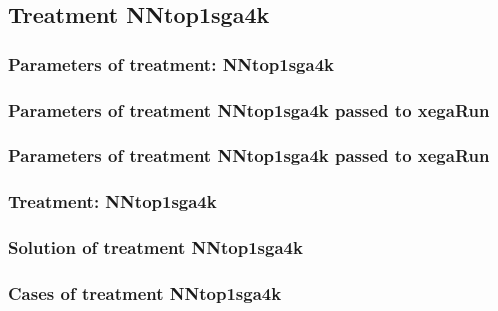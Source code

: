 \documentclass[18pt,c]{beamer}
\makeatletter
\def\beamer@writeslidentry@miniframesoff{%
  \expandafter\beamer@ifempty\expandafter{\beamer@framestartpage}{}%
  {%
   \clearpage\beamer@notesactions%
  }
}
\newcommand*{\miniframesoff}{\let\beamer@writeslidentry=\beamer@writeslidentry@miniframesoff}
\makeatother
\begin{document}
\miniframesoff
\subsection{Treatment NNtop1sga4k}

 \begin{frame}
 \fontsize{8pt}{9pt}\selectfont
 \frametitle{  Parameters of treatment: NNtop1sga4k 
 }

 \label{ExpDtParmTable006.tex}  
 \end{frame}


 \begin{frame}
 \fontsize{8pt}{9pt}\selectfont
 \frametitle{  Parameters of treatment NNtop1sga4k passed to xegaRun
 }

 \label{ExpDtParmTable007.tex}  
 \end{frame}


 \begin{frame}
 \fontsize{8pt}{9pt}\selectfont
 \frametitle{  Parameters of treatment NNtop1sga4k passed to xegaRun
 }

 \label{ExpDtParmTable008.tex}  
 \end{frame}

 \begin{frame}
 \fontsize{8pt}{9pt}\selectfont
 \frametitle{ Treatment: NNtop1sga4k }

 \label{ExpDStatsTable005.tex}  
 \end{frame}

 \begin{frame}
 \fontsize{8pt}{9pt}\selectfont
 \frametitle{ Solution of treatment NNtop1sga4k }

 \label{ExpDSolutionTable004.tex}  
 \end{frame}

 \begin{frame}
 \fontsize{8pt}{9pt}\selectfont
 \frametitle{ Cases of treatment NNtop1sga4k }

 \label{ExpDSolutionTable005.tex}  
 \end{frame}
\end{document}
